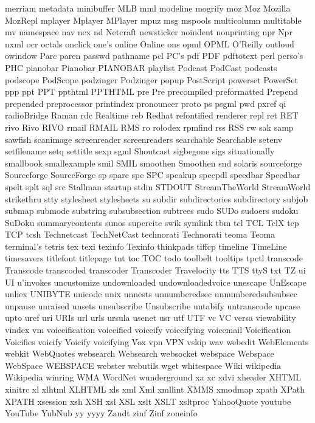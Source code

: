 merriam
metadata
minibuffer
MLB
mml
modeline
mogrify
moz
Moz
Mozilla
MozRepl
mplayer
Mplayer
MPlayer
mpuz
msg
mspools
multicolumn
multitable
mv
namespace
nav
ncx
nd
Netcraft
newsticker
noindent
nonprinting
npr
Npr
nxml
ocr
octals
onclick
one's
online
Online
ons
opml
OPML
O'Reilly
outloud
owindow
Parc
paren
passwd
pathname
pcl
PC's
pdf
PDF
pdftotext
perl
perso's
PHC
pianobar
Pianobar
PIANOBAR
playlist
Podcast
PodCast
podcasts
podscope
PodScope
podzinger
Podzinger
popup
PostScript
powerset
PowerSet
ppp
ppt
PPT
ppthtml
PPTHTML
pre
Pre
precompiled
preformatted
Prepend
prepended
preprocessor
printindex
pronouncer
proto
ps
psgml
pwd
pxref
qi
radioBridge
Raman
rdc
Realtime
reb
Redhat
refontified
renderer
repl
ret
RET
rivo
Rivo
RIVO
rmail
RMAIL
RMS
ro
rolodex
rpmfind
rss
RSS
rw
sak
samp
sawfish
scanimage
screenreader
screenreaders
searchable
Searchable
setenv
setfilename
setq
settitle
sexp
sgml
Shoutcast
sigbegone
sigs
situationally
smallbook
smallexample
smil
SMIL
smoothen
Smoothen
snd
solaris
sourceforge
Sourceforge
SourceForge
sp
sparc
spc
SPC
speakup
specpdl
speedbar
Speedbar
spelt
splt
sql
src
Stallman
startup
stdin
STDOUT
StreamTheWorld
StreamWorld
strikethru
stty
stylesheet
stylesheets
su
subdir
subdirectories
subdirectory
subjob
submap
submode
substring
subsubsection
subtrees
sudo
SUDo
sudoers
sudoku
SuDoku
summarycontents
sunos
supercite
swik
symlink
tbm
tcl
TCL
TclX
tcp
TCP
tcsh
Technetcast
TechNetCast
technorati
Technorati
teoma
Teoma
terminal's
tetris
tex
texi
texinfo
Texinfo
thinkpads
tiffcp
timeline
TimeLine
timesavers
titlefont
titlepage
tnt
toc
TOC
todo
toolbelt
tooltips
tpctl
transcode
Transcode
transcoded
transcoder
Transcoder
Travelocity
tts
TTS
ttyS
txt
TZ
ui
UI
u'invokes
uncustomize
undownloaded
undownloadedvoice
unescape
UnEscape
unhex
UNIBYTE
unicode
unix
unnests
unnumberedsec
unnumberedsubsubsec
unpause
unraised
unsets
unsubscribe
Unsubscribe
untabify
untranscode
upcase
upto
uref
uri
URIs
url
urls
ursula
usenet
usr
utf
UTF
vc
VC
versa
viewability
vindex
vm
voiceification
voiceified
voiceify
voiceifying
voicemail
Voicification
Voicifies
voicify
Voicify
voicifying
Vox
vpn
VPN
vskip
wav
webedit
WebElements
webkit
WebQuotes
websearch
Websearch
websocket
webspace
Webspace
WebSpace
WEBSPACE
webster
webutils
wget
whitespace
Wiki
wikipedia
Wikipedia
winring
WMA
WordNet
wunderground
xa
xc
xdvi
xheader
XHTML
xinitrc
xl
xlhtml
XLHTML
xls
xml
Xml
xmllint
XMMS
xmodmap
xpath
XPath
XPATH
xsession
xsh
XSH
xsl
XSL
xslt
XSLT
xsltproc
YahooQuote
youtube
YouTube
YubNub
yy
yyyy
Zandt
zinf
Zinf
zoneinfo

